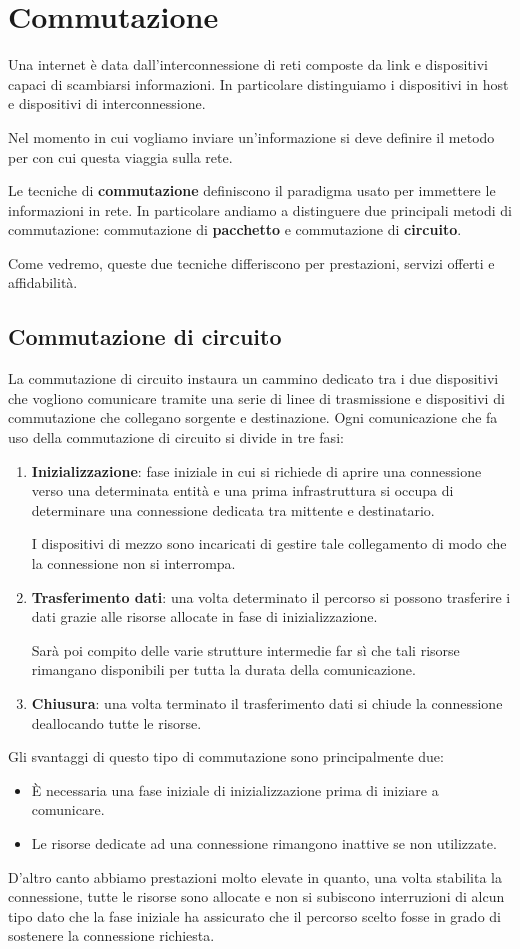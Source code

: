 \section{Commutazione}
Una internet è data dall'interconnessione di reti composte da link e 
dispositivi capaci di scambiarsi informazioni. In particolare
distinguiamo i dispositivi in host e dispositivi di interconnessione.

Nel momento in cui vogliamo inviare un'informazione si deve definire
il metodo per con cui questa viaggia sulla rete.

Le tecniche di \textbf{commutazione} definiscono il paradigma usato 
per immettere le informazioni in rete. In particolare andiamo a 
distinguere due principali metodi di commutazione: commutazione di 
\textbf{pacchetto} e commutazione di \textbf{circuito}.

Come vedremo, queste due tecniche differiscono per prestazioni, 
servizi offerti e affidabilità.

\subsection{Commutazione di circuito}
La commutazione di circuito instaura un cammino dedicato tra i due
dispositivi che vogliono comunicare tramite una serie di linee di 
trasmissione e dispositivi di commutazione che collegano sorgente e 
destinazione. Ogni comunicazione che fa uso della commutazione di 
circuito si divide in tre fasi:
\begin{enumerate}
	\item \textbf{Inizializzazione}: fase iniziale in cui si richiede 
		di aprire una connessione verso una determinata entità e una 
		prima infrastruttura si occupa di determinare una connessione 
		dedicata tra mittente e destinatario.

		I dispositivi di mezzo sono incaricati di gestire tale 
		collegamento di modo che la connessione non si interrompa.
	\item \textbf{Trasferimento dati}: una volta determinato il 
		percorso si possono trasferire i dati grazie alle risorse
		allocate in fase di inizializzazione.

		Sarà poi compito delle varie strutture intermedie far sì che
		tali risorse rimangano disponibili per tutta la durata della 
		comunicazione.
	\item \textbf{Chiusura}: una volta terminato il trasferimento dati
		si chiude la connessione deallocando tutte le risorse.
\end{enumerate}
Gli svantaggi di questo tipo di commutazione sono principalmente due:
\begin{itemize}
	\item \`E necessaria una fase iniziale di inizializzazione prima
		di iniziare a comunicare.
	\item Le risorse dedicate ad una connessione rimangono inattive 
		se non utilizzate.
\end{itemize}
D'altro canto abbiamo prestazioni molto elevate in quanto, una volta 
stabilita la connessione, tutte le risorse sono allocate e non si 
subiscono interruzioni di alcun tipo dato che la fase iniziale ha 
assicurato che il percorso scelto fosse in grado di sostenere la 
connessione richiesta.

